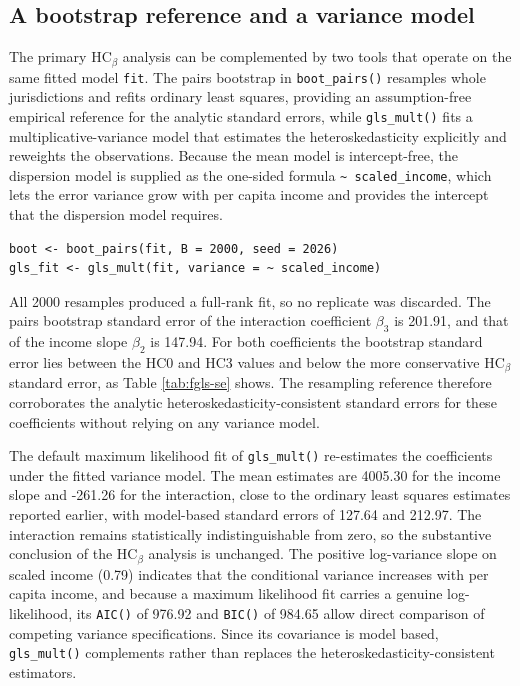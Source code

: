 \subsection{A bootstrap reference and a variance model}\label{a-bootstrap-reference-and-a-variance-model}

The primary \(\text{HC}_\beta\) analysis can be complemented by two tools that operate on the same fitted model \texttt{fit}. The pairs bootstrap in \texttt{boot\_pairs()} resamples whole jurisdictions and refits ordinary least squares, providing an assumption-free empirical reference for the analytic standard errors, while \texttt{gls\_mult()} fits a multiplicative-variance model that estimates the heteroskedasticity explicitly and reweights the observations. Because the mean model is intercept-free, the dispersion model is supplied as the one-sided formula \texttt{\textasciitilde{}\ scaled\_income}, which lets the error variance grow with per capita income and provides the intercept that the dispersion model requires.

\begin{verbatim}
boot <- boot_pairs(fit, B = 2000, seed = 2026)
gls_fit <- gls_mult(fit, variance = ~ scaled_income)
\end{verbatim}

All 2000 resamples produced a full-rank fit, so no replicate was discarded. The pairs bootstrap standard error of the interaction coefficient \(\beta_3\) is 201.91, and that of the income slope \(\beta_2\) is 147.94. For both coefficients the bootstrap standard error lies between the HC0 and HC3 values and below the more conservative \(\text{HC}_\beta\) standard error, as Table \ref{tab:fgls-se} shows. The resampling reference therefore corroborates the analytic heteroskedasticity-consistent standard errors for these coefficients without relying on any variance model.

The default maximum likelihood fit of \texttt{gls\_mult()} re-estimates the coefficients under the fitted variance model. The mean estimates are 4005.30 for the income slope and -261.26 for the interaction, close to the ordinary least squares estimates reported earlier, with model-based standard errors of 127.64 and 212.97. The interaction remains statistically indistinguishable from zero, so the substantive conclusion of the \(\text{HC}_\beta\) analysis is unchanged. The positive log-variance slope on scaled income (0.79) indicates that the conditional variance increases with per capita income, and because a maximum likelihood fit carries a genuine log-likelihood, its \texttt{AIC()} of 976.92 and \texttt{BIC()} of 984.65 allow direct comparison of competing variance specifications. Since its covariance is model based, \texttt{gls\_mult()} complements rather than replaces the heteroskedasticity-consistent estimators.

